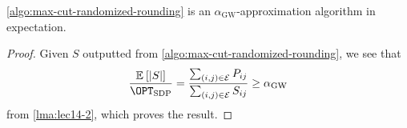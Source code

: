 \begin{theorem}\label{thm:max-cut}
	\autoref{algo:max-cut-randomized-rounding} is an \(\alpha _\mathrm{GW}\)-approximation algorithm in expectation.
\end{theorem}
\begin{proof}
	Given \(S\) outputted from \autoref{algo:max-cut-randomized-rounding}, we see that
	\[
		\frac{\mathbb{E}_{}\left[\left\vert S \right\vert \right] }{\OPT_{\mathrm{SDP} }} = \frac{\sum_{(i, j)\in \mathcal{E} } P_{ij} }{\sum_{(i, j)\in \mathcal{E} } S_{ij} } \geq \alpha _{\mathrm{GW} }
	\]
	from \autoref{lma:lec14-2}, which proves the result.
\end{proof}